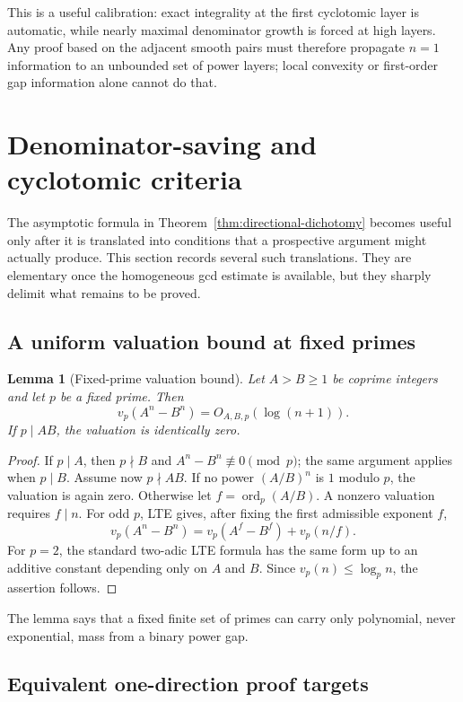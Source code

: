 \documentclass[11pt,oneside]{article}
\newtheorem{lemma}[theorem]{Lemma}
\theoremstyle{definition}
\theoremstyle{remark}
\newcommand{\ord}{\operatorname{ord}}
\begin{document}
This is a useful calibration: exact integrality at the first cyclotomic layer is automatic,
while nearly maximal denominator growth is forced at high layers.  Any proof based on the
adjacent smooth pairs must therefore propagate $n=1$ information to an unbounded set of
power layers; local convexity or first-order gap information alone cannot do that.


\section{Denominator-saving and cyclotomic criteria}
\label{sec:criteria}

The asymptotic formula in Theorem~\ref{thm:directional-dichotomy} becomes useful only after
it is translated into conditions that a prospective argument might actually produce.  This
section records several such translations.  They are elementary once the homogeneous gcd
estimate is available, but they sharply delimit what remains to be proved.

\subsection{A uniform valuation bound at fixed primes}

\begin{lemma}[Fixed-prime valuation bound]
\label{lem:fixed-prime-valuation}
Let $A>B\ge1$ be coprime integers and let $p$ be a fixed prime.  Then
\[
 v_p(A^n-B^n)=O_{A,B,p}(\log(n+1)).
\]
If $p\mid AB$, the valuation is identically zero.
\end{lemma}

\begin{proof}
If $p\mid A$, then $p\nmid B$ and $A^n-B^n\not\equiv0\pmod p$; the same argument applies
when $p\mid B$.  Assume now $p\nmid AB$.  If no power $(A/B)^n$ is $1$ modulo $p$, the
valuation is again zero.  Otherwise let $f=\ord_p(A/B)$.  A nonzero valuation requires
$f\mid n$.  For odd $p$, LTE gives, after fixing the first admissible exponent $f$,
\[
 v_p(A^n-B^n)=v_p(A^f-B^f)+v_p(n/f).
\]
For $p=2$, the standard two-adic LTE formula has the same form up to an additive constant
depending only on $A$ and $B$.  Since $v_p(n)\le \log_p n$, the assertion follows.
\end{proof}

The lemma says that a fixed finite set of primes can carry only polynomial, never
exponential, mass from a binary power gap.

\subsection{Equivalent one-direction proof targets}
\end{document}
